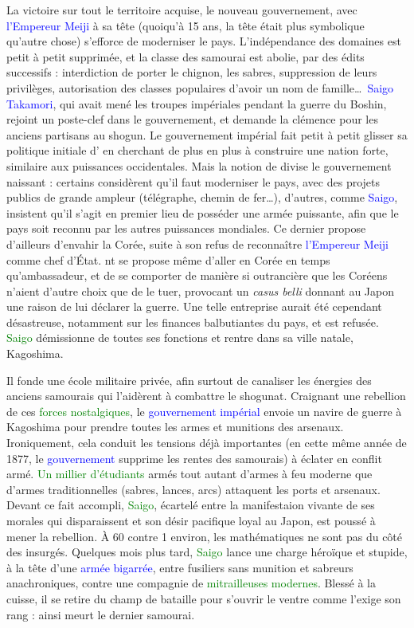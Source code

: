 La victoire sur tout le territoire acquise, le nouveau gouvernement, avec
\textcolor{blue}{l'Empereur Meiji} à sa tête (quoiqu'à 15 ans, la tête était
plus symbolique qu'autre chose) s'efforce de moderniser le pays.
L'indépendance des domaines est petit à petit supprimée, et la classe des
samourai est abolie, par des édits successifs : interdiction de porter le
chignon, les sabres, suppression de leurs privilèges, autorisation des classes
populaires d'avoir un nom de famille\dots\ \textcolor{blue}{Saigo Takamori},
qui avait mené les troupes impériales pendant la guerre du Boshin, rejoint un
poste-clef dans le gouvernement, et demande la clémence pour les anciens
partisans au shogun. Le gouvernement impérial fait petit à petit glisser sa
politique initiale d' en cherchant de plus en
plus à construire une nation forte, similaire aux puissances occidentales.
Mais la notion de  divise le gouvernement naissant :
certains considèrent qu'il faut moderniser le pays, avec des projets publics
de grande ampleur (télégraphe, chemin de fer\dots), d'autres, comme
\textcolor{blue}{Saigo}, insistent qu'il s'agit en premier lieu de posséder
une armée puissante, afin que le pays soit reconnu par les autres puissances
mondiales. Ce dernier propose d'ailleurs d'envahir la Corée, suite à son refus
de reconnaître \textcolor{blue}{l'Empereur Meiji} comme chef d'État. nt se
propose même d'aller en Corée en temps qu'ambassadeur, et de se comporter de
manière si outrancière que les Coréens n'aient d'autre choix que de le tuer,
provocant un \emph{casus belli} donnant au Japon une raison de lui déclarer la
guerre. Une telle entreprise aurait été cependant désastreuse, notamment sur
les finances balbutiantes du pays, et est refusée. \textcolor{green}{Saigo}
démissionne de toutes ses fonctions et rentre dans sa ville natale, Kagoshima.

Il fonde une école militaire privée, afin surtout de canaliser les énergies
des anciens samourais qui l'aidèrent à combattre le shogunat. Craignant une
rebellion de ces \textcolor{green}{forces nostalgiques}, le
\textcolor{blue}{gouvernement impérial} envoie un navire de guerre à Kagoshima
pour prendre toutes les armes et munitions des arsenaux. Ironiquement, cela
conduit les tensions déjà importantes (en cette même année de 1877, le
\textcolor{blue}{gouvernement} supprime les rentes des samourais) à éclater en
conflit armé. \textcolor{green}{Un millier d'étudiants} armés tout autant
d'armes à feu moderne que d'armes traditionnelles (sabres, lances, arcs)
attaquent les ports et arsenaux. Devant ce fait accompli,
\textcolor{green}{Saigo}, écartelé entre la manifestaion vivante de ses
morales qui disparaissent et son désir pacifique loyal au Japon, est poussé à
mener la rebellion. À 60 contre 1 environ, les mathématiques ne sont pas du
côté des insurgés. Quelques mois plus tard, \textcolor{green}{Saigo} lance une
charge héroïque et stupide, à la tête d'une \textcolor{blue}{armée bigarrée},
entre fusiliers sans munition et sabreurs anachroniques, contre une compagnie
de \textcolor{green}{mitrailleuses modernes}. Blessé à la cuisse, il se retire
du champ de bataille pour s'ouvrir le ventre comme l'exige son rang : ainsi
meurt le dernier samourai. 

